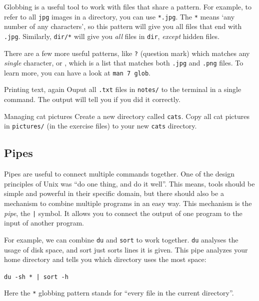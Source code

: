 \documentclass{TheAlternativeCourse}
\begin{document}
Globbing is a useful tool to work with files that share a pattern. For example,
to refer to all \texttt{jpg} images in a directory, you can use \texttt{*.jpg}.
The \texttt{*} means `any number of any characters', so this pattern will give
you all files that end with \texttt{.jpg}. Similarly, \texttt{dir/*} will give
you \emph{all} files in \texttt{dir}, \emph{except} hidden files.

There are a few more useful patterns, like \texttt{?} (question mark) which
matches any \emph{single} character, or \texttt{},
which is a list that matches both \texttt{.jpg} and \texttt{.png} files. To
learn more, you can have a look at \texttt{man 7 glob}.

\begin{exercisebox}{{Printing text, again}}
    Ouput all \texttt{.txt} files in \texttt{notes/} to the terminal in
    a single command. The output will tell you if you did it correctly.
\end{exercisebox}

\begin{exercisebox}{Managing cat pictures}
    Create a new directory called \texttt{cats}. Copy all cat pictures in
    \texttt{pictures/} (in the exercise files) to your new \texttt{cats}
    directory.
\end{exercisebox}

\subsection{Pipes}

Pipes are useful to connect multiple commands together. One of the design
principles of Unix was ``do one thing, and do it well''. This means, tools
should be simple and powerful in their specific domain, but there should also
be a mechanism to combine multiple programs in an easy way. This mechanism is
the \emph{pipe}, the \texttt{|} symbol. It allows you to connect the output of
one program to the input of another program.

For example, we can combine \texttt{du} and \texttt{sort} to work together.
\texttt{du} analyses the usage of disk space, and sort just sorts lines
it is given. This pipe analyzes your home directory and tells you which
directory uses the most space:

\begin{cmdbox}
    \texttt{du -sh * | sort -h}
\end{cmdbox}

Here the \texttt{*} globbing pattern stands for ``every file in the current
directory''.
\end{document}
